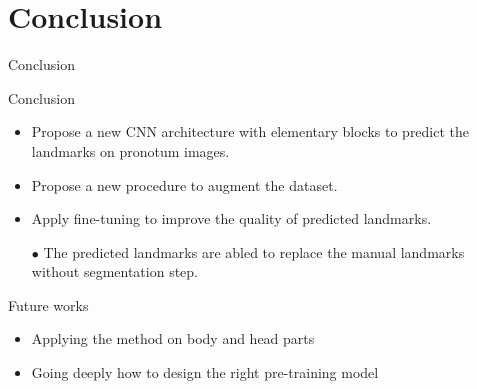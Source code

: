 \documentclass[10pt,svgnames]{beamer}
\begin{document}
\section{Conclusion}
\begin{frame}{Conclusion}
	\begin{block}{Conclusion}
		\small{
			\begin{itemize}
				\item Propose a new CNN architecture with elementary blocks to predict the landmarks on pronotum images.
				\item Propose a new procedure to augment the dataset.
				\item Apply fine-tuning to improve the quality of predicted landmarks.
				\item[\textcolor{citem}{$\bullet$}] The predicted landmarks are abled to replace the manual landmarks without segmentation step.
			\end{itemize}
		}
	\end{block}
	\pause
	\begin{block}{Future works}
		\small{
			\begin{itemize}
				\item Applying the method on body and head parts 
				\item Going deeply how to design the right pre-training model
			\end{itemize}					
			}
	\end{block}
\end{frame}

{\1
\begin{frame}
\end{frame}}
\end{document}
